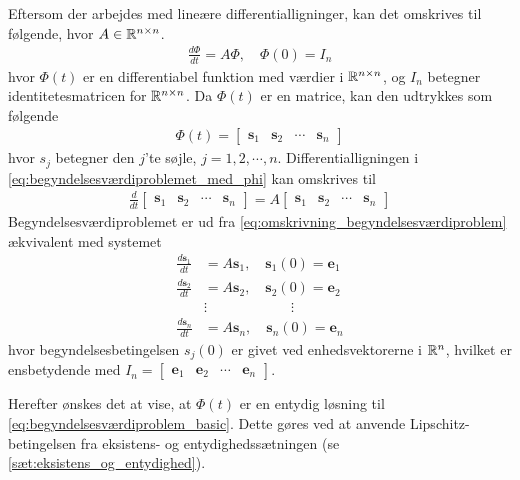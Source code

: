 Eftersom der arbejdes med lineære differentialligninger, kan det omskrives til følgende, hvor $A \in \mathbb{R}^{n \times n}$.
%
%
\begin{align}\label{eq:begyndelsesværdiproblemet_med_phi}
  \frac{d\Phi}{dt}=A\Phi, \quad \Phi(0)=I_n
\end{align}
%
hvor $\Phi(t)$ er en differentiabel funktion med værdier i $\mathbb{R}^{n \times n}$, og $I_n$ betegner identitetesmatricen for $\mathbb{R}^{n\times n}$. Da $\Phi(t)$ er en matrice, kan den udtrykkes som følgende
\begin{align*}
    \Phi(t)=\begin{bmatrix}\mathbf{s}_1 & \mathbf{s}_2 & \cdots & \mathbf{s}_n\end{bmatrix}
\end{align*}
%
hvor $s_j$ betegner den $j$'te søjle, $j=1, 2, \cdots, n$. Differentialligningen i \eqref{eq:begyndelsesværdiproblemet_med_phi} kan omskrives til
\begin{align}
    \frac{d}{dt}\begin{bmatrix}\mathbf{s}_1 & \mathbf{s}_2 & \cdots & \mathbf{s}_n\end{bmatrix}=A\begin{bmatrix}\mathbf{s}_1 & \mathbf{s}_2 & \cdots & \mathbf{s}_n\end{bmatrix} \label{eq:omskrivning_begyndelsesværdiproblem}
\end{align}
%
Begyndelsesværdiproblemet er ud fra \eqref{eq:omskrivning_begyndelsesværdiproblem} ækvivalent med systemet
\begin{align*}
    \frac{d \mathbf{s}_1}{dt}&=A\mathbf{s}_1, \quad \mathbf{s}_1(0)=\mathbf{e}_1\\
    \frac{d \mathbf{s}_2}{dt}&=A\mathbf{s}_2, \quad \mathbf{s}_2(0)=\mathbf{e}_2\\
    &\vdots \quad\quad\quad\quad\quad\quad \vdots\\
    \frac{d \mathbf{s}_n}{dt}&=A\mathbf{s}_n, \quad \mathbf{s}_n(0)=\mathbf{e}_n
\end{align*}
%
hvor begyndelsesbetingelsen $s_j(0)$ er givet ved enhedsvektorerne i $\mathbb{R}^n$, hvilket er ensbetydende med $I_{n}=\begin{bmatrix}\textbf{e}_1 & \textbf{e}_2 & \cdots & \textbf{e}_n\end{bmatrix}$.

Herefter ønskes det at vise, at $\Phi(t)$ er en entydig løsning til \eqref{eq:begyndelsesværdiproblem_basic}. Dette gøres ved at anvende Lipschitz-betingelsen fra eksistens- og entydighedssætningen (se \autoref{sæt:eksistens_og_entydighed}).


